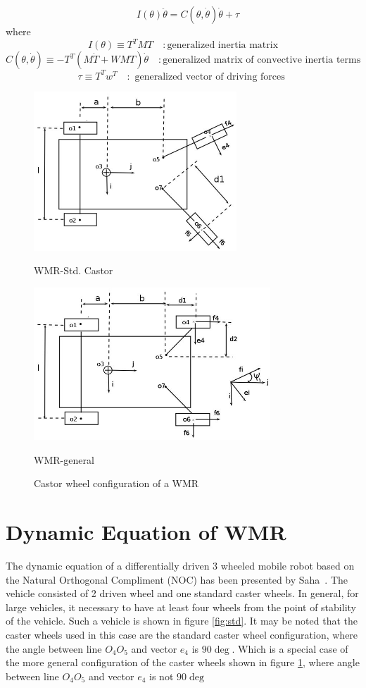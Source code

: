 \begin{equation}
\label{CE}
 \quad I(\theta)\ddot{\theta}=C(\theta,\dot{\theta})\dot{\theta}+\tau
\end{equation}
where
\[I(\theta)\equiv T^TMT\quad :\text{generalized inertia matrix}\]
\[C(\theta,\dot{\theta})\equiv -T^T(M\dot{T}+WMT)\dot{\theta} \quad :\text{generalized matrix of convective inertia terms}\]
\[\tau\equiv T^Tw^T \quad :\text{ generalized vector of driving forces }\]


\begin{figure}
	\begin{minipage}[t]{0.5\textwidth}
	\centering
		\includegraphics[width=3in]{Chapter4/fig/fig1.jpg} 
		\caption{WMR-Std. Castor}\label{fig:std}
	\end{minipage}
	\hfill
	\begin{minipage}[t]{0.5\textwidth}
	\centering
		\includegraphics[width=3.5in]{Chapter4/fig/fig2.jpg} 
		\caption{WMR-general}\label{fig:gen}
			\end{minipage}
\caption{Castor wheel configuration of a WMR}
\end{figure}


\section{Dynamic Equation of WMR}
The dynamic equation of a differentially driven 3 wheeled mobile robot based on the  Natural Orthogonal Compliment (NOC) has been presented by Saha~\cite{saha1991dynamics}. The vehicle consisted of 2 driven wheel and one standard caster wheels. In general, for large vehicles, it necessary to have at least four wheels from the point of stability of the vehicle. Such a vehicle is shown in figure \ref{fig:std}. It may be noted that the caster wheels used in this case are the standard caster wheel configuration, where the angle between line $O_4O_5$ and vector $e_4$ is  $90\deg$. Which is a special case of the more general configuration of the caster wheels shown in figure \ref{fig:gen}, where angle between line $O_4O_5$ and vector $e_4$ is not $90\deg$

